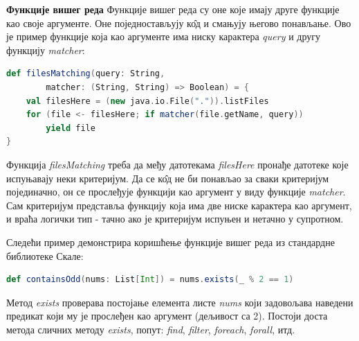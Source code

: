 \documentclass[12pt,oneside]{memoir}
\begin{document}
\begin{description}
\item \textbf{Функције вишег реда} %
Функције вишег реда су оне које имају друге функције као своје аргументе. Оне поједностављују к\^{о}д и смањују његово понављање. Ово је пример функције која као аргументе има ниску карактера \textit{query} и другу функцију \textit{matcher}:
\begin{lstlisting}[language=Scala]
def filesMatching(query: String, 
		matcher: (String, String) => Boolean) = {
	val filesHere = (new java.io.File(".")).listFiles
	for (file <- filesHere; if matcher(file.getName, query))
		yield file
}
\end{lstlisting}
Функција \textit{filesMatching} треба да међу датотекама \textit{filesHere} пронађе датотеке које испуњавају неки критеријум. Да се к\^{о}д не би понављао за сваки критеријум појединачно, он се прослеђује функцији као аргумент у виду функције \textit{matcher}. Сам критеријум представља функцију која има две ниске карактера као аргумент, и враћа логички тип - тачно ако је критеријум испуњен и нетачно у супротном.
\par Следећи пример демонстрира коришћење функције вишег реда из стандардне библиотеке Скале:
\begin{lstlisting}[language=Scala]
def containsOdd(nums: List[Int]) = nums.exists(_ % 2 == 1)
\end{lstlisting}
Метод \textit{exists} проверава постојање елемента листе \textit{nums} који задовољава наведени предикат који му је прослеђен као аргумент (дељивост са 2).  Постоји доста метода сличних методу \textit{exists}, попут: \textit{find}, \textit{filter}, \textit{foreach}, \textit{forall}, итд.


\end{description}
\end{document}
